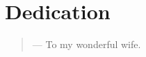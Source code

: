 \chapter*{Dedication}

{
  \raggedleft\large{}
  \begin{quote}
  \hfill--- To my wonderful wife.
  \end{quote}
}
